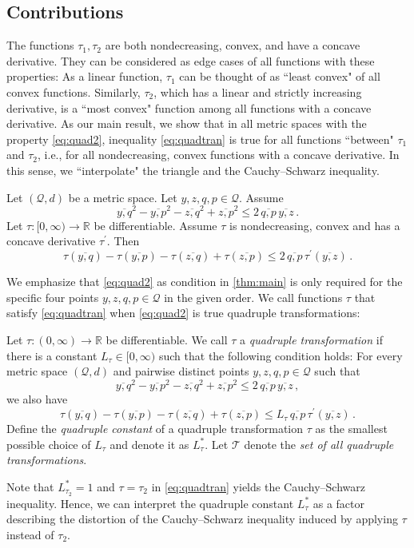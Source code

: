 \documentclass{article}
\newcommand*{\mc}[1]{\mathcal{#1}}
\newcommand{\R}{\mathbb{R}}
\newcommand{\Rp}{[0, \infty)} %
\newcommand{\pr}{^\prime}
\newcommand{\equationFullstop}{\, .}
\newcommand{\eqfs}{\equationFullstop}
\newcommand{\equationComma}{\, ,}
\newcommand{\eqcm}{\equationComma}
\newcommand{\ol}[2]{\overline{#1,#2}}
\newcommand{\tran}{\tau}
\newcommand{\Tran}{\mc{T}}
\newcommand{\dtran}{\tran\pr}
\newcommand{\ctransymbol}{L}
\newcommand{\ctrano}[1]{\ctransymbol_{#1}}
\newcommand{\ctranobest}[1]{\ctransymbol_{#1}^{*}}
\newcommand{\ctranbest}{\ctranobest{\tran}}
\newcommand{\ctran}{\ctrano{\tran}}
\begin{document}
\subsection{Contributions}
%
The functions $\tran_1, \tran_2$ are both nondecreasing, convex, and have a concave derivative. They can be considered as edge cases of all functions with these properties: As a linear function, $\tran_1$ can be thought of as ``least convex" of all convex functions. Similarly, $\tran_2$, which has a linear and strictly increasing derivative, is a ``most convex" function among all functions with a concave derivative. As our main result, we show that in all metric spaces with the property \eqref{eq:quad2}, inequality \eqref{eq:quadtran} is true for all functions ``between" $\tran_1$ and $\tran_2$, i.e., for all nondecreasing, convex functions with a concave derivative. In this sense, we ``interpolate" the triangle and the Cauchy--Schwarz inequality.
%
\begin{theorem}\label{thm:main}
	Let $(\mc Q, d)$ be a metric space.
	Let $y,z,q,p\in\mc Q$. Assume
	\begin{equation*}
		\ol yq^2 - \ol yp^2 - \ol zq^2 + \ol zp^2 \leq 2 \, \ol qp\, \ol yz
		\eqfs
	\end{equation*}
	Let $\tran\colon[0,\infty)\to\R$ be differentiable. Assume $\tran$ is nondecreasing, convex and has a concave derivative $\dtran$. Then
	\begin{equation}\label{eq:main}
		\tran(\ol yq)  - \tran(\ol yp) - \tran(\ol zq) + \tran(\ol zp) \leq 2 \, \ol qp \, \dtran(\ol yz)\eqfs
	\end{equation}
\end{theorem}
%
We emphasize that \eqref{eq:quad2} as condition in \cref{thm:main} is only required for the specific four points $y,z,q,p\in\mc Q$ in the given order.
We call functions $\tran$ that satisfy \eqref{eq:quadtran} when \eqref{eq:quad2} is true quadruple transformations:
%
\begin{definition}
	Let $\tran\colon(0,\infty)\to\R$ be differentiable. We call $\tran$ a \textit{quadruple transformation} if there is a constant  $\ctran\in\Rp$ such that the following condition holds:
	For every metric space $(\mc Q, d)$ and pairwise distinct points $y,z,q,p\in\mc Q$ such that
	\begin{equation*}
		\ol yq^2 - \ol yp^2 - \ol zq^2 + \ol zp^2 \leq 2\, \ol qp\, \ol yz\eqcm
	\end{equation*}
	we also have
	\begin{equation*}
		\tran(\ol yq)  - \tran(\ol yp) - \tran(\ol zq) + \tran(\ol zp) \leq \ctran\,  \ol qp \, \dtran(\ol yz)
		\eqfs
	\end{equation*}
	Define the \textit{quadruple constant} of a quadruple transformation $\tran$ as the smallest possible choice of $\ctran$ and denote it as $\ctranbest$.
	Let $\Tran$ denote the \textit{set of all quadruple transformations}. 
\end{definition}
%
Note that $L^*_{\tran_2} = 1$ and $\tran = \tran_2$ in \eqref{eq:quadtran} yields the Cauchy--Schwarz inequality. Hence, we can interpret the quadruple constant $\ctranbest$ as a factor describing the distortion of the Cauchy--Schwarz inequality induced by applying $\tran$ instead of $\tran_2$. 
\end{document}
